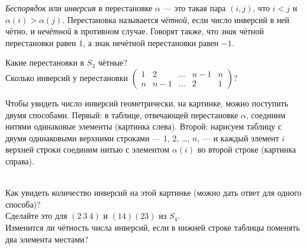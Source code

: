 \documentclass[a4paper,12pt]{article}
\begin{document}



\emph{Беспорядок} или \emph{инверсия} в перестановке $\alpha$
--- это такая пара $(i,j)$, что $i<j$ и $\alpha(i)>\alpha(j)$.
Перестановка называется \emph{чётной}, если число инверсий в ней
чётно, и \emph{нечётной} в противном случае.
Говорят также, что {\em знак} чётной перестановки равен $1$, а знак нечётной перестановки равен $-1$.


Какие перестановки в $S_3$ чётные?\\
Сколько инверсий у перестановки
$
\displaystyle
\begin{pmatrix}
1&2&\dots&n-1&n\\n&n-1&\dots&2&1
\end{pmatrix}
$?



 Чтобы увидеть число инверсий геометрически, на картинке, можно поступить двумя способами. Первый: в таблице, отвечающей перестановке $\alpha$, соединим нитями одинаковые элементы (картинка слева). Второй: нарисуем таблицу с двумя одинаковыми верхними строками --- 1, 2, \ldots, $n$, --- и каждый элемент $i$ верхней строки соединим нитью с элементом $\alpha(i)$ во второй строке (картинка справа).\\
\qquad
{}\\
 Как увидеть количество инверсий на этой картинке  (можно дать ответ для одного способа)?\\
 Сделайте это для $(2\ 3\ 4)$ и $(14)(23)$ из $S_4$.\\
 Изменится ли чётность числа инверсий, если в нижней строке таблицы поменять два элемента местами?
\end{document}
